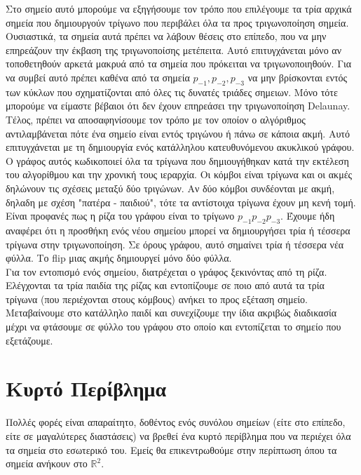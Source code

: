 \documentclass[oneside,12pt]{book}
\newcommand{\R}{\mathbb{R}}
\theoremstyle{definition}
\begin{document}
Στο σημείο αυτό μπορούμε να εξηγήσουμε τον τρόπο που επιλέγουμε τα τρία αρχικά σημεία που δημιουργούν τρίγωνο που περιβάλει όλα τα προς τριγωνοποίηση σημεία. Ουσιαστικά, τα σημεία αυτά πρέπει να λάβουν θέσεις στο επίπεδο, που να μην επηρεάζουν την έκβαση της τριγωνοποίσης μετέπειτα. Αυτό επιτυγχάνεται μόνο αν τοποθετηθούν αρκετά μακρυά από τα σημεία που πρόκειται να τριγωνοποιηθούν. Για να συμβεί αυτό πρέπει καθένα από τα σημεία \(p_{-1}, p_{-2}, p_{-3}\) να μην βρίσκονται εντός των κύκλων που σχηματίζονται από όλες τις δυνατές τριάδες σημειων. Μόνο τότε μπορούμε να είμαστε βέβαιοι ότι δεν έχουν επηρεάσει την τριγωνοποίηση Delaunay. \\

Τέλος, πρέπει να αποσαφηνίσουμε τον τρόπο με τον οποίον ο αλγόριθμος αντιλαμβάνεται πότε ένα σημείο είναι εντός τριγώνου ή πάνω σε κάποια ακμή. Αυτό επιτυγχάνεται με τη δημιουργία ενός κατάλληλου κατευθυνόμενου ακυκλικού γράφου. Ο γράφος αυτός κωδικοποιεί όλα τα τρίγωνα που δημιουγήθηκαν κατά την εκτέλεση του αλγορίθμου και την χρονική τους ιεραρχία. Οι κόμβοι είναι τρίγωνα και οι ακμές δηλώνουν τις σχέσεις μεταξύ δύο τριγώνων. Αν δύο κόμβοι συνδέονται με ακμή, δηλαδη με σχέση "πατέρα - παιδιού", τότε τα αντίστοιχα τρίγωνα έχουν μη κενή τομή. Είναι προφανές πως η ρίζα του γράφου είναι το τρίγωνο \(p_{-1} p_{-2} p_{-3}\). Έχουμε ήδη αναφέρει ότι η προσθήκη ενός νέου σημείου μπορεί να δημιουργήσει τρία ή τέσσερα τρίγωνα στην τριγωνοποίηση. Σε όρους γράφου, αυτό σημαίνει τρία ή τέσσερα νέα φύλλα. Το flip μιας ακμής δημιουργεί μόνο δύο φύλλα. \\

Για τον εντοπισμό ενός σημείου, διατρέχεται ο γράφος ξεκινόντας από τη ρίζα. Ελέγχονται τα τρία παιδία της ρίζας και εντοπίζουμε σε ποιο από αυτά τα τρία τρίγωνα (που περιέχονται στους κόμβους) ανήκει το προς εξέταση σημείο. Μεταβαίνουμε στο κατάλληλο παιδί και συνεχίζουμε την ίδια ακριβώς διαδικασία μέχρι να φτάσουμε σε φύλλο του γράφου στο οποίο και εντοπίζεται το σημείο που εξετάζουμε. \\ 

\section{Κυρτό Περίβλημα}

Πολλές φορές είναι απαραίτητο, δοθέντος ενός συνόλου σημείων (είτε στο επίπεδο, είτε σε μαγαλύτερες διαστάσεις) να βρεθεί ένα κυρτό περίβλημα που να περιέχει όλα τα σημεία στο εσωτερικό του. Εμείς θα επικεντρωθούμε στην περίπτωση όπου τα σημεία ανήκουν στο \(\R^2\). \\
\end{document}
